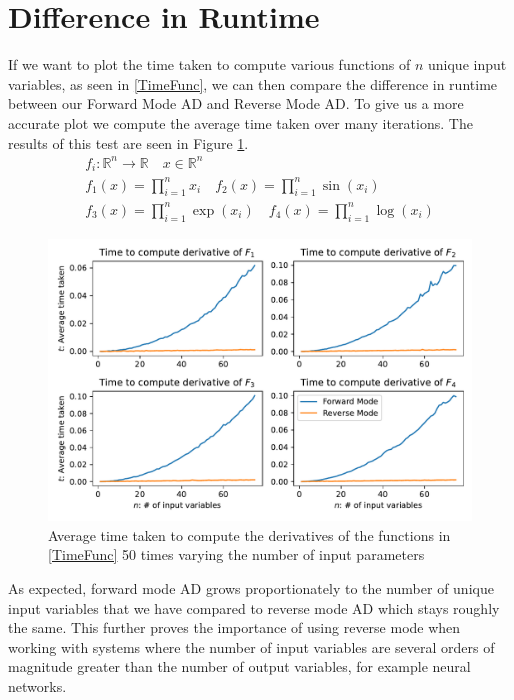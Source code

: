 \documentclass{article}
\begin{document}
\section{Difference in Runtime}

If we want to plot the time taken to compute various functions of $n$ unique input variables, as seen in \eqref{TimeFunc}, we can then compare the difference in runtime between our Forward Mode AD and Reverse Mode AD. To give us a more accurate plot we compute the average time taken over many iterations. The results of this test are seen in Figure \ref{fig:TimeDiff}.
\begin{equation} \label{TimeFunc}
    \begin{gathered}
        f_i: \mathbb{R}^n \longrightarrow \mathbb{R} \quad x \in \mathbb{R}^n \\
        f_1(x) = \prod_{i=1}^n x_i  \quad f_2(x) = \prod_{i=1}^n \sin(x_i) \\
        f_3(x) = \prod_{i=1}^n \exp(x_i)  \quad f_4(x) = \prod_{i=1}^n \log(x_i)
    \end{gathered}
\end{equation}

\begin{figure}[h]
    \centering
    \includegraphics[width=15cm]{images/Graph_TimeDiff.pdf}
    \caption{Average time taken to compute the derivatives of the functions in \eqref{TimeFunc} 50 times varying the number of input parameters}
    \label{fig:TimeDiff}
\end{figure}

As expected, forward mode AD grows proportionately to the number of unique input variables that we have compared to reverse mode AD which stays roughly the same. This further proves the importance of using reverse mode when working with systems where the number of input variables are several orders of magnitude greater than the number of output variables, for example neural networks.
\end{document}
